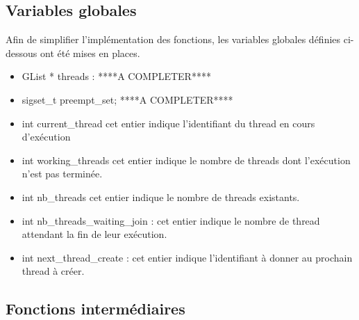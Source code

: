 \documentclass{article}
\begin{document}
\noindent{}


\subsection{Variables globales}

Afin de simplifier l'implémentation des fonctions, les variables globales définies ci-dessous ont été mises en places.

\begin{itemize}

    \item GList * threads : ****A COMPLETER****\\

    \item sigset\_t preempt\_set; ****A COMPLETER****\\

    \item int current\_thread cet entier indique l'identifiant du thread en cours d'exécution\\

    \item int working\_threads cet entier indique le nombre de threads dont l'exécution n'est pas terminée.\\

    \item int nb\_threads cet entier indique le nombre de threads existants. \\

    \item int nb\_threads\_waiting\_join : cet entier indique le nombre de thread attendant la fin de leur exécution.\\

    \item int next\_thread\_create : cet entier indique l'identifiant à donner au prochain thread à créer.

\end{itemize}

\subsection{Fonctions intermédiaires}
\end{document}
